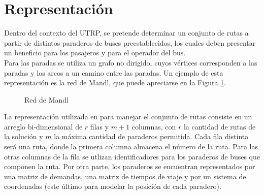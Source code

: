 \section{Representación}

Dentro del contexto del UTRP, se pretende determinar un conjunto de rutas a partir de distintos paraderos de buses preestablecidos, los cuales deben presentar un beneficio para los pasajeros y para el operador del bus.\\

Para las paradas se utiliza un grafo no dirigido, cuyos vértices corresponden a las paradas y los arcos a un camino entre las paradas. Un ejemplo de esta representación es la red de Mandl, que puede apreciarse en la Figura \ref{fig:mandl}.

\begin{figure}[!htb]
\begin{center}
\caption{Red de Mandl}
\label{fig:mandl}
\end{center}
\end{figure}

La representación utilizada en \cite{metaheuristic2010} para manejar el conjunto de rutas consiste en un arreglo bi-dimensional de $r$ filas y $m+1$ columnas, con $r$ la cantidad de rutas de la solución y $m$ la máxima cantidad de paraderos permitida. Cada fila distinta será una ruta, donde la primera columna almacena el número de la ruta. Para las otras columnas de la fila se utlizan identificadores para los paraderos de buses que componen la ruta. Por otra parte, los paraderos se encuentran representados por una matriz de demandas, una matriz de tiempos de viaje y por un sistema de coordenadas (este último para modelar la posición de cada paradero).

